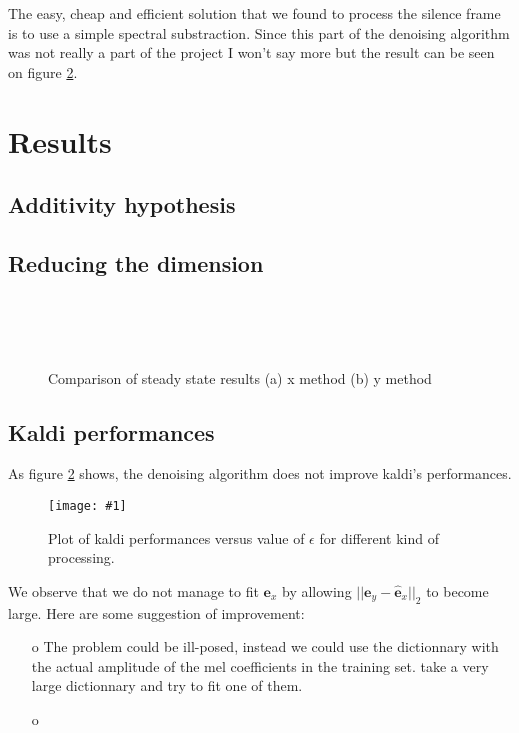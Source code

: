 \documentclass[a4paper]{report}
\newcommand{\img}[3]{\begin{figure}[!h] \centering \texttt{[image: \#1]}\captionsetup{justification=centering} \caption{#3} \label{#1} \end{figure}}
\newcommand{\ey}{\textbf{e}_y}
\newcommand{\ex}{\textbf{e}_x}
\newcommand{\exhat}{ \hat{\textbf{e}}_x }
\newcommand{\scale}{0.4}
\begin{document}
The easy, cheap and efficient solution that we found to process the silence frame is to use a simple spectral substraction.
Since this part of the denoising algorithm was not really a part of the project I won't say more but the result can be seen on figure \ref{kaldiperformances}.



\pagebreak
\section{Results}
\subsection{Additivity hypothesis}

\subsection{Reducing the dimension}

\begin{figure}[!ht]
\centering
     \\
     \\
     \\
     \caption{Comparison of steady state results (a) x method (b) y method}
     \label{steady_state}
\end{figure}

\subsection{Kaldi performances}


As figure \ref{kaldiperformances} shows, the denoising algorithm does not improve kaldi's performances.
\img{kaldiperformances}{.5}{Plot of kaldi performances versus value of $\epsilon$ for different kind of processing.}

We observe that we do not manage to fit $\ex$ by allowing $||\ey-\exhat||_2$ to become large.
Here are some suggestion of improvement:
\begin{itemize}
\item[o] The problem could be ill-posed, instead we could use the dictionnary with the actual amplitude of the mel coefficients in the training set. take a very large dictionnary and try to fit one of them.
\item[o]
\end{itemize}


\end{document}
